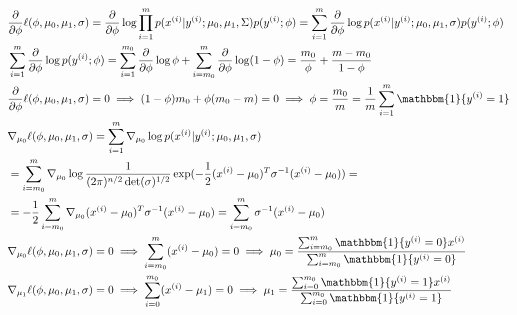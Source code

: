 \documentclass{article}
\begin{document}
\begin{align*}
    & \frac{\partial}{\partial\phi}\ell(\phi,\mu_{0},\mu_{1},\sigma)=\frac{\partial}{\partial\phi}\log\prod_{i=1}^{m}p(x^{(i)}|y^{(i)};\mu_{0},\mu_{1},\Sigma)p(y^{(i)};\phi)=\sum_{i=1}^{m}\frac{\partial}{\partial\phi}\log p(x^{(i)}|y^{(i)};\mu_{0},\mu_{1},\sigma)p(y^{(i)};\phi)                       \\
    & \sum_{i=1}^{m}\frac{\partial}{\partial\phi}\log p(y^{(i)};\phi)=\sum_{i=1}^{m_{0}}\frac{\partial}{\partial\phi}\log\phi+\sum_{i=m_{0}}^{m}\frac{\partial}{\partial\phi}\log(1-\phi)=\frac{m_{0}}{\phi}+\frac{m-m_{0}}{1-\phi}                                                                          \\
    & \frac{\partial}{\partial\phi}\ell(\phi,\mu_{0},\mu_{1},\sigma)= 0 \implies (1-\phi)m_{0}+\phi(m_{0}-m)=0 \implies \phi = \frac{m_0}{m} = \frac{1}{m}\sum_{i=1}^{m}\mathbbm{1}\{y^{(i)}=1\}                                                                                                             \\
    & \nabla_{\mu_{0}}\ell(\phi,\mu_{0},\mu_{1},\sigma)=\sum_{i=1}^{m}\nabla_{\mu_{0}}\log p(x^{(i)}|y^{(i)};\mu_{0},\mu_{1},\sigma)                                                                                                                                                                         \\
    & =\sum_{i=m_{0}}^{m}\nabla_{\mu_{0}}\log\frac{1}{(2\pi)^{n/2}\det(\sigma)^{1/2}}\exp(-\frac{1}{2}(x^{(i)}-\mu_{0})^{T}\sigma^{-1}(x^{(i)}-\mu_{0})) =                                                                                                                                                   \\
    & = -\frac{1}{2}\sum_{i=m_{0}}^{m}\nabla_{\mu_{0}}(x^{(i)}-\mu_{0})^{T}\sigma^{-1}(x^{(i)}-\mu_{0})
  = \sum_{i=m_{0}}^{m}\sigma^{-1}(x^{(i)}-\mu_{0}) \\
    & \nabla_{\mu_{0}}\ell(\phi,\mu_{0},\mu_{1},\sigma)=0 \implies \sum_{i=m_{0}}^{m}(x^{(i)}-\mu_{0})=0\implies \mu_{0}=\frac{\sum_{i=m_0}^{m}\mathbbm{1}\{{y^{(i)}=0}\}x^{(i)}}{\sum_{i=m_0}^{m}\mathbbm{1}\{{y^{(i)}=0}\}}                                                                                \\
    & \nabla_{\mu_{1}}\ell(\phi,\mu_{0},\mu_{1},\sigma)=0 \implies \sum_{i=0}^{m_{0}}(x^{(i)}-\mu_{1})=0\implies \mu_{1}=\frac{\sum_{i=0}^{m_{0}}\mathbbm{1}\{{y^{(i)}=1}\}x^{(i)}}{\sum_{i=0}^{m_{0}}\mathbbm{1}\{{y^{(i)}=1}\}}                                                                            \\

\end{align*}
\end{document}

